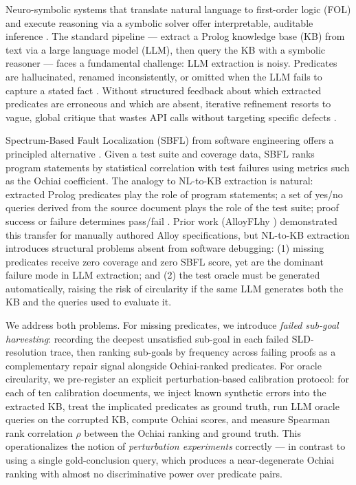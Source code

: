\documentclass[11pt,letterpaper]{article}
\begin{document}
Neuro-symbolic systems that translate natural language to first-order logic (FOL) and execute reasoning via a symbolic solver offer interpretable, auditable inference \citep{Han2022,Pan2023}. The standard pipeline — extract a Prolog knowledge base (KB) from text via a large language model (LLM), then query the KB with a symbolic reasoner — faces a fundamental challenge: LLM extraction is noisy. Predicates are hallucinated, renamed inconsistently, or omitted when the LLM fails to capture a stated fact \citep{Olausson2023,Ye2022}. Without structured feedback about which extracted predicates are erroneous and which are absent, iterative refinement resorts to vague, global critique that wastes API calls without targeting specific defects \citep{Madaan2023}.

Spectrum-Based Fault Localization (SBFL) from software engineering offers a principled alternative \citep{Abreu2007}. Given a test suite and coverage data, SBFL ranks program statements by statistical correlation with test failures using metrics such as the Ochiai coefficient. The analogy to NL-to-KB extraction is natural: extracted Prolog predicates play the role of program statements; a set of yes/no queries derived from the source document plays the role of the test suite; proof success or failure determines pass/fail \citep{Reps1997}. Prior work (AlloyFLhy \citep{Wang2020}) demonstrated this transfer for manually authored Alloy specifications, but NL-to-KB extraction introduces structural problems absent from software debugging: (1) missing predicates receive zero coverage and zero SBFL score, yet are the dominant failure mode in LLM extraction; and (2) the test oracle must be generated automatically, raising the risk of circularity if the same LLM generates both the KB and the queries used to evaluate it.

We address both problems. For missing predicates, we introduce \emph{failed sub-goal harvesting}: recording the deepest unsatisfied sub-goal in each failed SLD-resolution trace, then ranking sub-goals by frequency across failing proofs as a complementary repair signal alongside Ochiai-ranked predicates. For oracle circularity, we pre-register an explicit perturbation-based calibration protocol: for each of ten calibration documents, we inject known synthetic errors into the extracted KB, treat the implicated predicates as ground truth, run LLM oracle queries on the corrupted KB, compute Ochiai scores, and measure Spearman rank correlation $\rho$ between the Ochiai ranking and ground truth. This operationalizes the notion of \emph{perturbation experiments} correctly — in contrast to using a single gold-conclusion query, which produces a near-degenerate Ochiai ranking with almost no discriminative power over predicate pairs.
\end{document}
